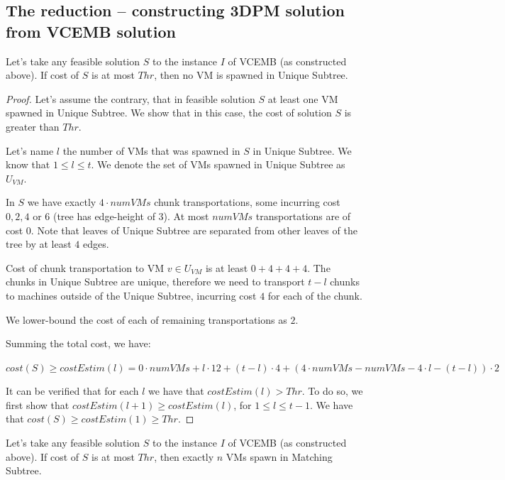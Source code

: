 \documentclass[conference,10pt]{IEEEtran}
\begin{document}
\subsection{The reduction -- constructing 3DPM solution from VCEMB
  solution}

\begin{theorem}
  Let's take any feasible solution $S$ to the instance $I$ of VCEMB
  (as constructed above). If cost of $S$ is at most $Thr$, then no VM
  is spawned in Unique Subtree.
  \label{th:no-unique}
\end{theorem}

\begin{proof}
  Let's assume the contrary, that in feasible solution $S$ at least
  one VM spawned in Unique Subtree. We show that in this case, the
  cost of solution $S$ is greater than $Thr$.

  Let's name $l$ the number of VMs that was spawned in $S$ in Unique
  Subtree. We know that $1 \leq l \leq t$. We denote the set of VMs
  spawned in Unique Subtree as $U_{VM}$.

  In $S$ we have exactly $4 \cdot numVMs$ chunk transportations, some
  incurring cost $0, 2, 4$ or $6$ (tree has edge-height of $3$). At
  most $numVMs$ transportations are of cost $0$. Note that leaves of
  Unique Subtree are separated from other leaves of the tree by at
  least $4$ edges.

  Cost of chunk transportation to VM $v \in U_{VM}$ is at least
  $0 + 4 + 4 + 4$. The chunks in Unique Subtree are unique, therefore
  we need to transport $t - l$ chunks to machines outside of the
  Unique Subtree, incurring cost $4$ for each of the chunk.

  We lower-bound the cost of each of remaining transportations as $2$.

  Summing the total cost, we have:

  $cost(S) \geq costEstim(l) = 0 \cdot numVMs + l \cdot 12 +
  (t-l)\cdot 4 + (4\cdot numVMs - numVMs - 4\cdot l - (t-l))\cdot 2$

  It can be verified that for each $l$ we have that
  $costEstim(l) > Thr$. To do so, we first show that
  $costEstim(l+1) \geq costEstim(l)$, for $1\leq l \leq t-1$. We have
  that $cost(S) \geq costEstim(1) \geq Thr$.
\end{proof}

\begin{theorem}
  Let's take any feasible solution $S$ to the instance $I$ of VCEMB
  (as constructed above). If cost of $S$ is at most $Thr$, then
  exactly $n$ VMs spawn in Matching Subtree.
  \label{th:np-balance}
\end{theorem}
\end{document}

